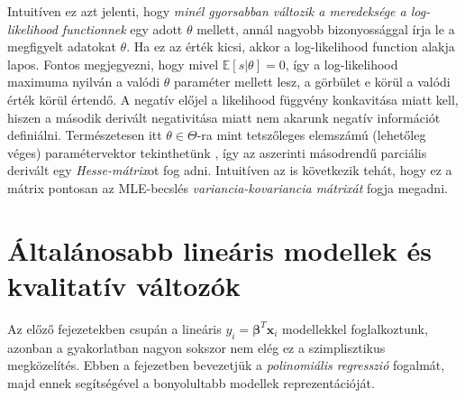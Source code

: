 \documentclass[14p]{report}
\def\pmb{\boldsymbol}
\newcounter{x}
\newcounter{y}
\newcounter{z}
\begin{document}
	Intuitíven ez azt jelenti, hogy \emph{minél gyorsabban változik a meredeksége a log-likelihood functionnek} egy adott $\theta$ mellett, annál nagyobb bizonyossággal írja le a megfigyelt adatokat $\theta$. Ha ez az érték kicsi, akkor a log-likelihood function alakja lapos. Fontos megjegyezni, hogy mivel $\mathbb{E}[s\rvert \theta] = 0$, így a log-likelihood maximuma nyilván a valódi $\theta$ paraméter mellett lesz, a görbület e körül a valódi érték körül értendő. A negatív előjel a likelihood függvény konkavitása miatt kell, hiszen a második derivált negativitása miatt nem akarunk negatív információt definiálni. Természetesen itt $\theta \in \Theta$-ra mint tetszőleges elemszámú (lehetőleg véges) paramétervektor tekinthetünk , így az aszerinti másodrendű parciális derivált egy \emph{Hesse-mátrix}ot fog adni. Intuitíven az is következik tehát, hogy ez a mátrix pontosan az MLE-becslés \emph{variancia-kovariancia mátrixát} fogja megadni. 
	\chapter{Általánosabb lineáris modellek és kvalitatív változók}
	Az előző fejezetekben csupán a lineáris $y_i = \pmb{\beta}^{T}\pmb{x}_i$ modellekkel foglalkoztunk, azonban a gyakorlatban nagyon sokszor nem elég ez a szimplisztikus megközelítés. Ebben a fejezetben bevezetjük a \emph{polinomiális regresszió} fogalmát, majd ennek segítségével a bonyolultabb modellek reprezentációját.
	
\end{document}
